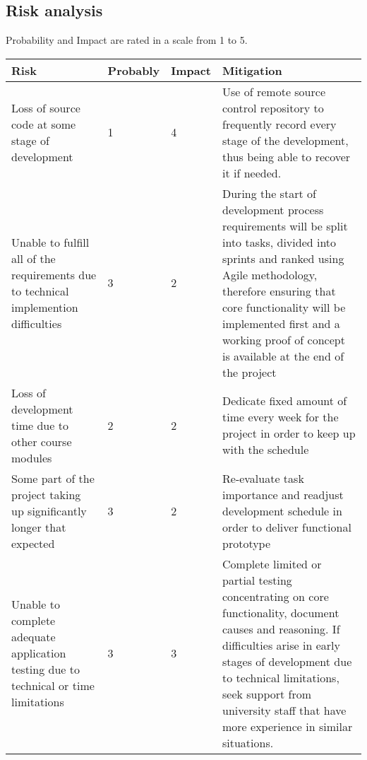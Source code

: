 \subsection{Risk analysis}
Probability and Impact are rated in a scale from 1 to 5.

\def\riska{Loss of source code at some stage of development}
\def \probabilitya {1}
\def \impacta {4}
\def \mitigationa {Use of remote source control  repository to frequently record every stage of the development, thus being able to recover it if needed. }

\def\riskaa{Unable to fulfill all of the requirements due to technical implemention difficulties}
\def \probabilityaa {3}
\def \impactaa {2}
\def \mitigationaa {During the start of development process requirements will be split into tasks, divided into sprints and ranked using Agile methodology, therefore ensuring that core functionality will be implemented first and a working proof of concept is available at the end of the project }

\def\riskaaa{Loss of development time due to other course modules}
\def \probabilityaaa {2}
\def \impactaaa {2}
\def \mitigationaaa {Dedicate fixed amount of time every week for the project in order to keep up with the schedule }

\def\riskaaaa{Some part of the project taking up significantly longer that expected}
\def \probabilityaaaa {3}
\def \impactaaaa {2}
\def \mitigationaaaa {Re-evaluate task importance and readjust development schedule in order to deliver functional prototype }

\def\riskaaaaa{Unable to complete adequate application testing due to technical or time limitations}
\def \probabilityaaaaa {3}
\def \impactaaaaa {3}
\def \mitigationaaaaa {Complete limited or partial testing concentrating on core functionality, document causes and reasoning. If difficulties arise in early stages of development  due to technical limitations, seek support from university staff that have more experience in similar situations. }

\begin{center}
\begin{tabular}{ |m{5cm}|m{2cm}|m{1cm}|m{6cm}| } 
 \hline
 Risk & Probably & Impact & Mitigation \\ 
 \hline
 \riska & \probabilitya & \impacta & \mitigationa \\ 
 \hline
 \riskaa & \probabilityaa & \impactaa & \mitigationaa \\ 
 \hline
 \riskaaa & \probabilityaaa & \impactaaa & \mitigationaaa \\ 
 \hline
 \riskaaaa & \probabilityaaaa & \impactaaaa & \mitigationaaaa \\ 
 \hline
 \riskaaaaa & \probabilityaaaaa & \impactaaaaa & \mitigationaaaaa \\ 
 \hline
\end{tabular}
\end{center}




